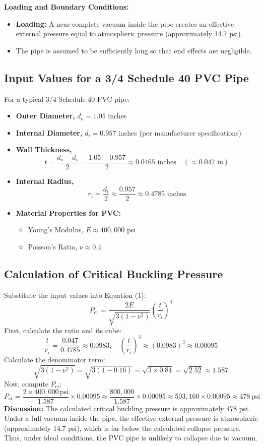 \documentclass[12pt]{report}
\begin{document}
\noindent\textbf{Loading and Boundary Conditions:}
\begin{itemize}
    \item \textbf{Loading:} A near-complete vacuum inside the pipe creates an effective external pressure equal to atmospheric pressure (approximately 14.7 psi).
    \item The pipe is assumed to be sufficiently long so that end effects are negligible.
\end{itemize}

\subsection{Input Values for a 3/4 Schedule 40 PVC Pipe}
For a typical 3/4 Schedule 40 PVC pipe:
\begin{itemize}
    \item \textbf{Outer Diameter,} \(d_o = 1.05\) inches
    \item \textbf{Internal Diameter,} \(d_i = 0.957\) inches (per manufacturer specifications)
    \item \textbf{Wall Thickness,} 
    \[
    t = \frac{d_o - d_i}{2} = \frac{1.05 - 0.957}{2} \approx 0.0465 \text{ inches} \quad (\approx 0.047 \text{ in})
    \]
    \item \textbf{Internal Radius,} 
    \[
    r_i = \frac{d_i}{2} \approx \frac{0.957}{2} \approx 0.4785 \text{ inches}
    \]
    \item \textbf{Material Properties for PVC:}
    \begin{itemize}
        \item Young's Modulus, \(E \approx 400{,}000\) psi
        \item Poisson's Ratio, \(\nu \approx 0.4\)
    \end{itemize}
\end{itemize}

\subsection{Calculation of Critical Buckling Pressure}
Substitute the input values into Equation (1):
\[
P_{\text{cr}} = \frac{2E}{\sqrt{3(1-\nu^2)}} \left(\frac{t}{r_i}\right)^3
\]
First, calculate the ratio and its cube:
\[
\frac{t}{r_i} = \frac{0.047}{0.4785} \approx 0.0983, \quad \left(\frac{t}{r_i}\right)^3 \approx (0.0983)^3 \approx 0.00095
\]
Calculate the denominator term:
\[
\sqrt{3(1-\nu^2)} = \sqrt{3(1-0.16)} = \sqrt{3 \times 0.84} = \sqrt{2.52} \approx 1.587
\]
Now, compute \(P_{\text{cr}}\):
\[
P_{\text{cr}} = \frac{2 \times 400{,}000\,\text{psi}}{1.587} \times 0.00095 \approx \frac{800{,}000}{1.587} \times 0.00095 \approx 503{,}160 \times 0.00095 \approx 478\,\text{psi}
\]
\textbf{Discussion:}  
The calculated critical buckling pressure is approximately 478 psi. Under a full vacuum inside the pipe, the effective external pressure is atmospheric (approximately 14.7 psi), which is far below the calculated collapse pressure. Thus, under ideal conditions, the PVC pipe is unlikely to collapse due to vacuum. 
\end{document}
